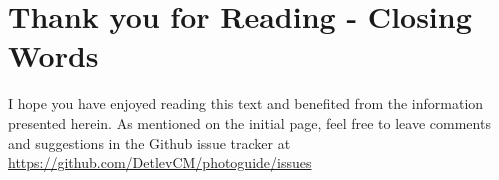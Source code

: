 \chapter{Thank you for Reading - Closing Words}

I hope you have enjoyed reading this text and benefited from the information presented herein. 
As mentioned on the initial page, feel free to leave comments and suggestions in the Github issue tracker at \href{https://github.com/DetlevCM/photoguide/issues}{https://github.com/DetlevCM/photoguide/issues}

